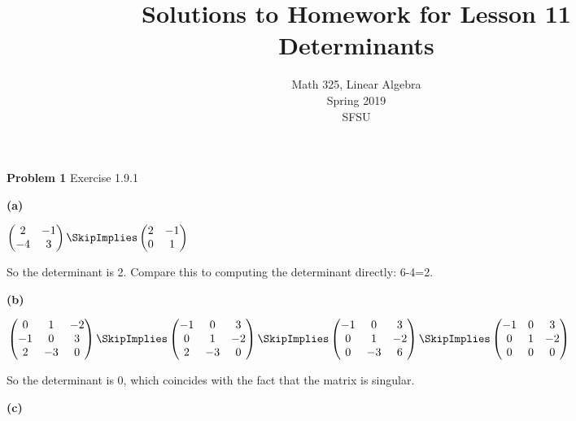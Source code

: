 \documentclass[oneside,12pt]{amsart}
\begin{document}
\title{Solutions to Homework for Lesson 11 \\ Determinants}
\author{Math 325, Linear Algebra \\ Spring 2019\\ SFSU }
\date{}

\maketitle


\textbf{Problem 1} Exercise 1.9.1

\textbf{(a)}

\bigskip

$
\begin{pmatrix}
2 & -1 \\
-4 & 3
\end{pmatrix}
\SkipImplies
\begin{pmatrix}
2 & -1 \\
0 & 1
\end{pmatrix}
$

\bigskip

So the determinant is 2. Compare this to computing the determinant directly: 6-4=2.

\bigskip

\textbf{(b)}

\bigskip

$
\begin{pmatrix}
0 & 1 & -2 \\
-1 & 0 & 3 \\
2 & -3 & 0
\end{pmatrix}
\SkipImplies
\begin{pmatrix}
-1 & 0 & 3 \\
0 & 1 & -2 \\
2 & -3 & 0
\end{pmatrix}
\SkipImplies
\begin{pmatrix}
-1 & 0 & 3 \\
0 & 1 & -2 \\
0 & -3 & 6
\end{pmatrix}
\SkipImplies
\begin{pmatrix}
-1 & 0 & 3 \\
0 & 1 & -2 \\
0 & 0 & 0
\end{pmatrix}
$

\bigskip

So the determinant is 0, which coincides with the fact that the matrix is singular.

\textbf{(c)}
\end{document}
